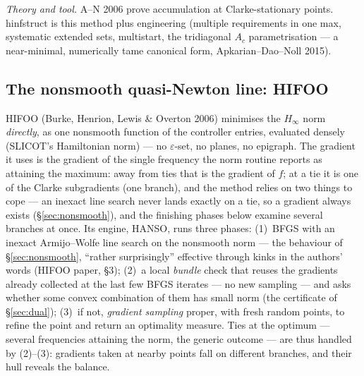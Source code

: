 \documentclass[11pt,a4paper]{article}
\newcommand{\eps}{\varepsilon}
\newcommand{\revd}[1]{#1}
\begin{document}
\emph{Theory and tool.}  A--N 2006 prove accumulation at Clarke-stationary points.
\textsf{hinfstruct} is this method plus engineering (multiple requirements in one max,
systematic extended sets, multistart, the tridiagonal $A_c$ parametrisation --- a
near-minimal, numerically tame canonical form, Apkarian--Dao--Noll 2015).

\revd{\subsection{The nonsmooth quasi-Newton line: \textsf{HIFOO}}
\label{sec:hifoo}
HIFOO (Burke, Henrion, Lewis \& Overton 2006) minimises the $H_\infty$ norm
\emph{directly}, as one nonsmooth function of the controller entries, evaluated densely
(SLICOT's Hamiltonian norm) --- no $\eps$-set, no planes, no epigraph.  The gradient it
uses is the gradient of the single frequency the norm routine reports as attaining the
maximum: away from ties that is the gradient of $f$; at a tie it is one of the Clarke
subgradients (one branch), and the method relies on two things to cope --- an inexact
line search never lands exactly on a tie, so a gradient always exists (\S\ref{sec:nonsmooth}),
and the finishing phases below examine several branches at once.  Its engine, HANSO,
runs three phases: (1)~BFGS with an inexact Armijo--Wolfe line search on the nonsmooth
norm --- the behaviour of \S\ref{sec:nonsmooth}, ``rather surprisingly'' effective
through kinks in the authors' words (HIFOO paper, \S3); (2)~a local \emph{bundle} check
that reuses the gradients already collected at the last few BFGS iterates --- no new
sampling --- and asks whether some convex combination of them has small norm (the
certificate of \S\ref{sec:dual}); (3)~if not, \emph{gradient sampling} proper, with fresh
random points, to refine the point and return an optimality measure.  Ties at the
optimum --- several frequencies attaining the norm, the generic outcome --- are thus
handled by (2)--(3): gradients taken at nearby points fall on different branches, and
their hull reveals the balance.

}
\end{document}
